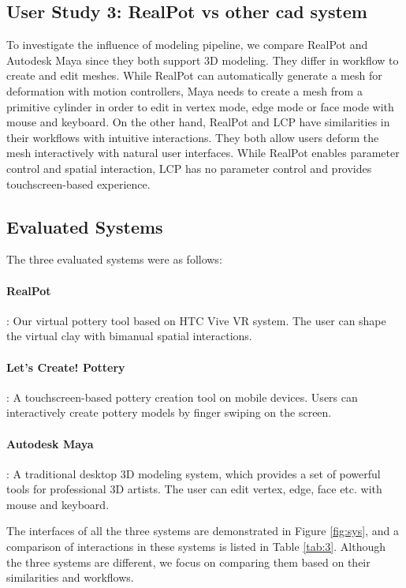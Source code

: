 \documentclass{svjour3}                     %
\begin{document}
\subsection{User Study 3: RealPot vs other cad system}
\label{sec:6.3}
To investigate the influence of modeling pipeline, we compare RealPot and Autodesk Maya since they both support 3D modeling. They differ in workflow to create and edit meshes. While RealPot can automatically generate a mesh for deformation with motion controllers, Maya needs to create a mesh from a primitive cylinder in order to edit in vertex mode, edge mode or face mode with mouse and keyboard. 
On the other hand, RealPot and LCP have similarities in their workflows with intuitive interactions. They both allow users deform the mesh interactively with natural user interfaces. While RealPot enables parameter control and spatial interaction, LCP has no parameter control and provides touchscreen-based experience.

\subsection{Evaluated Systems}
\label{sec:6.1}
The three evaluated systems were as follows:

\paragraph{RealPot}: Our virtual pottery tool based on HTC Vive VR system. The user can shape the virtual clay with bimanual spatial interactions.
\paragraph{Let’s Create! Pottery}: A touchscreen-based pottery creation tool on mobile devices. Users can interactively create pottery models by finger swiping on the screen.
\paragraph{Autodesk Maya}: A traditional desktop 3D modeling system, which provides a set of powerful tools for professional 3D artists. The user can edit vertex, edge, face etc. with mouse and keyboard.

The interfaces of all the three systems are demonstrated in Figure \ref{fig:sys}, and a comparison of interactions in these systems is listed in Table \ref{tab:3}. 
Although the three systems are different, we focus on comparing them based on their similarities and workflows.
\end{document}

